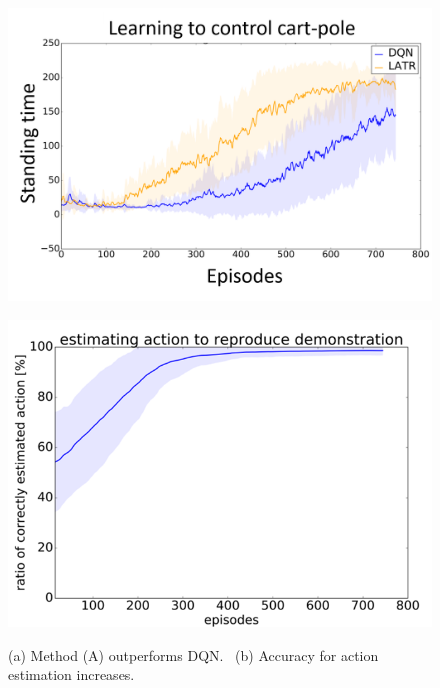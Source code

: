 \documentclass[twocolumn]{preport}
\begin{document}
\begin{figure}[htbp]
  \begin{minipage}{0.49\hsize}
    \begin{center}
      \includegraphics[width=1.00\columnwidth]{standing_time.png}
      \subcaption{}
    \end{center}
    \label{fig:one}
  \end{minipage}
  \begin{minipage}{0.49\hsize}
    \begin{center}
      \includegraphics[width=1.00\columnwidth]{demonstraion.png}
      \subcaption{}
    \end{center}
    \label{fig:two}
  \end{minipage}
  \caption{(a) Method (A) outperforms DQN. \ (b) Accuracy for action estimation increases.}
\end{figure}
\end{document}
